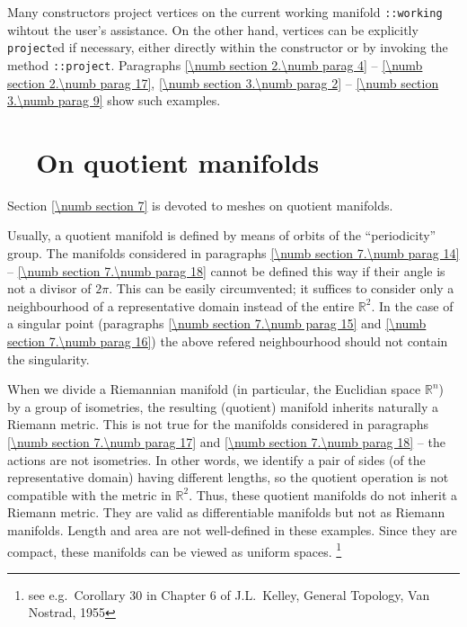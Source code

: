 Many {\small\tt{}} constructors project vertices on the current working manifold
{\small\tt{}::working} wihtout the user's assistance.
On the other hand, vertices can be explicitly {\small\tt project}ed if necessary,
either directly within the {\small\tt{}} constructor or by invoking the method
{\small\tt{}::project}.
Paragraphs \ref{\numb section 2.\numb parag 4} -- \ref{\numb section 2.\numb parag 17},
\ref{\numb section 3.\numb parag 2} -- \ref{\numb section 3.\numb parag 9} show such examples.


\section{~~On quotient manifolds}\label{\numb section 8.\numb parag 2}

Section \ref{\numb section 7} is devoted to meshes on quotient manifolds.

Usually, a quotient manifold is defined by means of orbits of the ``periodicity'' group.
The manifolds considered in paragraphs \ref{\numb section 7.\numb parag 14} --
\ref{\numb section 7.\numb parag 18} cannot be defined this way if their angle is not a
divisor of $ 2\pi $.
This can be easily circumvented; it suffices to consider only a neighbourhood of a representative
domain instead of the entire $ \mathbb{R}^2 $.
In the case of a singular point (paragraphs \ref{\numb section 7.\numb parag 15} and
\ref{\numb section 7.\numb parag 16}) the above refered neighbourhood should not contain
the singularity.

When we divide a Riemannian manifold (in particular, the Euclidian space $ \mathbb{R}^n $)
by a group of isometries, the resulting (quotient) manifold inherits naturally a Riemann metric.
This is not true for the manifolds considered in paragraphs \ref{\numb section 7.\numb parag 17}
and \ref{\numb section 7.\numb parag 18} -- the actions are not isometries.
In other words, we identify a pair of sides (of the representative domain) having different lengths,
so the quotient operation is not compatible with the metric in $ \mathbb{R}^2 $.
Thus, these quotient manifolds do not inherit a Riemann metric.
They are valid as differentiable manifolds but not as Riemann manifolds.
Length and area are not well-defined in these examples.
Since they are compact, these manifolds can be viewed as uniform spaces.%
\footnote {{} see e.g.\ Corollary 30 in Chapter 6 of J.L.~Kelley, General Topology, Van Nostrad, 1955}


